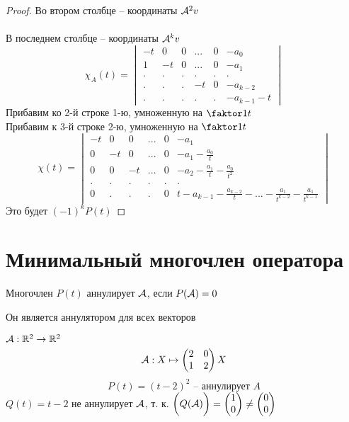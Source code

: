\begin{proof}
	Во втором столбце -- координаты $ \mathcal{A}^2v $ \\
	\widedots[10em] \\
	В последнем столбце -- координаты $ \mathcal{A}^kv $
	$$ \chi_A(t) =
	\begin{vmatrix}
		-t & 0 & 0 & ... & 0 & -a_0 \\
		1 & -t & 0 & ... & 0 & -a_1 \\
		. & . & . & . & . & . \\
		. & . & . & -t & 0 & -a_{k - 2} \\
		. & . & . & . & . & -a_{k - 1} - t
	\end{vmatrix} $$
	Прибавим ко 2-й строке 1-ю, умноженную на $ \faktor1t $ \\
	Прибавим к 3-й строке 2-ю, умноженную на $ \faktor1t $
	\widedots[10em]
	$$ \chi(t) =
	\begin{vmatrix}
		-t & 0 & 0 & ... & 0 & -a_1 \\
		0 & -t & 0 & ... & 0 & -a_1 - \frac{a_0}t \\
		0 & 0 & -t & ... & 0 & -a_2 - \frac{a_1}t - \frac{a_0}{t^2} \\
		. & . & . & . & . & . \\
		0 & . & . & . & 0 & t - a_{k - 1} - \frac{a_{k -2}}t - ... - \frac{a_1}{t^{k - 2}} - \frac{a_1}{t^{k - 1}}
	\end{vmatrix} $$
	Это будет $ (-1)^kP(t) $
\end{proof}

\section{Минимальный многочлен оператора}

\begin{definition}
	Многочлен $ P(t) $ аннулирует $ \mathcal{A} $, если $ P(\mathcal{A}) = 0 $
\end{definition}

\begin{remark}
	Он является аннулятором для всех векторов
\end{remark}

\begin{eg}
	$ \mathcal{A} : \mathbb{R}^2 \to \mathbb{R}^2 $
	$$ \mathcal{A} : X \mapsto
	\begin{pmatrix}
		2 & 0 \\
		1 & 2
	\end{pmatrix}X $$
	$$ P(t) = (t - 2)^2 \text{ -- аннулирует } A $$
	$ Q(t) = t - 2 $ не аннулирует $ \mathcal{A} $, т. к. $ \bigg( Q(\mathcal{A}) \bigg) =
	\begin{pmatrix}
		1 \\
		0
	\end{pmatrix} \ne
	\begin{pmatrix}
		0 \\
		0
	\end{pmatrix} $
\end{eg}

